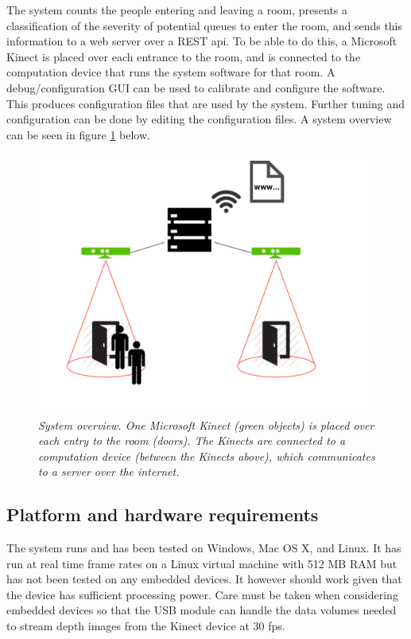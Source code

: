 The system counts the people entering and leaving a room, presents a classification of the severity of potential queues to enter the room, and sends this information to a web server over a REST api. To be able to do this, a Microsoft Kinect is placed over each entrance to the room, and is connected to the computation device that runs the system software for that room. A debug/configuration GUI can be used to calibrate and configure the software. This produces configuration files that are used by the system. Further tuning and configuration can be done by editing the configuration files. A system overview can be seen in figure \ref{fig:system_overview} below.

\begin{figure}[htb]
	\centering
	\includegraphics[width=\linewidth]{images/system_overview.pdf}
	\caption[Overview of the entire system]{\textit{System overview. One Microsoft Kinect (green objects) is placed over each entry to the room (doors). The Kinects are connected to a computation device (between the Kinects above), which communicates to a server over the internet.}}
	\label{fig:system_overview}  %
\end{figure}

\subsection{Platform and hardware requirements}
The system runs and has been tested on Windows, Mac OS X, and Linux. It has  run at real time frame rates on a Linux virtual machine with 512 MB RAM but has not been tested on any embedded devices. It however should work given that the device has sufficient processing power. Care must be taken when considering embedded devices so that the USB module can handle the data volumes needed to stream depth images from the Kinect device at 30 fps. 

